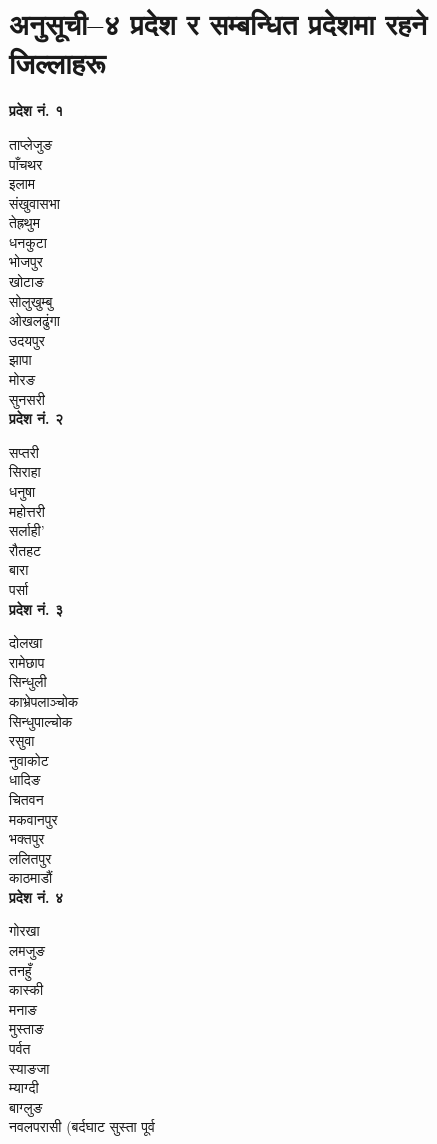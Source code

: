 \section{अनुसूची–४ प्रदेश र सम्बन्धित प्रदेशमा रहने जिल्लाहरू}

\begin{multicols*}{2}
    
\textbf{प्रदेश नं. १}

ताप्लेजुङ\\
पाँचथर\\
इलाम\\
संखुवासभा\\
तेह्रथुम\\
धनकुटा\\
भोजपुर\\
खोटाङ\\
सोलुखुम्बु\\
ओखलढुंगा\\
उदयपुर\\
झापा\\
मोरङ\\
सुनसरी\\

\textbf{प्रदेश नं. २}

सप्तरी\\
सिराहा\\
धनुषा\\
महोत्तरी\\
सर्लाही’\\
रौतहट\\
बारा\\
पर्सा \\

\textbf{प्रदेश नं. ३}

दोलखा\\
रामेछाप\\
सिन्धुली\\
काभ्रेपलाञ्चोक\\
सिन्धुपाल्चोक\\
रसुवा\\
नुवाकोट\\
धादिङ\\
चितवन\\
मकवानपुर\\
भक्तपुर\\
ललितपुर\\
काठमाडौं\\

\textbf{प्रदेश नं. ४}

गोरखा\\
लमजुङ\\
तनहुँ\\
कास्की\\
मनाङ\\
मुस्ताङ\\
पर्वत\\
स्याङजा\\
म्याग्दी\\
बाग्लुङ\\
नवलपरासी (बर्दघाट सुस्ता पूर्व\\


\end{multicols*}
